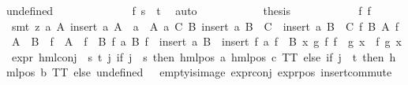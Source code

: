 \begin{isabellebody}
undefined{\isacharparenright}{\kern0pt}{\isacharparenright}{\kern0pt}\ {\isacharbackquote}{\kern0pt}\ {\isacharbraceleft}{\kern0pt}{\isacharbraceright}{\kern0pt}{\isacharparenright}{\kern0pt}{\isacharparenright}{\kern0pt}{\isachardoublequoteclose}\isanewline
\ \ \ \ \ \ \ \ \ \ \isamarkupfalse%
\ f{}\ {\isacartoucheopen}s\ {\isasymnoteq}\ t{\isacartoucheclose}\ \isamarkupfalse%
\ auto\isanewline
\ \ \ \ \ \ \ \ \isamarkupfalse%
\ \isamarkupfalse%
\ {\isacharquery}{\kern0pt}thesis\isanewline
\ \ \ \ \ \ \ \ \ \ \isamarkupfalse%
\ f{}\ f{}\ \isamarkupfalse%
\ {\isacharparenleft}{\kern0pt}smt\ {\isacharparenleft}{\kern0pt}z{}{\isacharparenright}{\kern0pt}\ {\isacartoucheopen}{\isasymAnd}a\ A{\isachardot}{\kern0pt}\ insert\ a\ A\ {\isacharequal}{\kern0pt}\ {\isacharbraceleft}{\kern0pt}a{\isacharbraceright}{\kern0pt}\ {\isasymunion}\ A{\isacartoucheclose}\ {\isacartoucheopen}{\isasymAnd}a\ C\ B{\isachardot}{\kern0pt}\ insert\ a\ B\ {\isasymunion}\ C\ {\isacharequal}{\kern0pt}\ insert\ a\ {\isacharparenleft}{\kern0pt}B\ {\isasymunion}\ C{\isacharparenright}{\kern0pt}{\isacartoucheclose}\ {\isacartoucheopen}{\isasymAnd}f\ B\ A{\isachardot}{\kern0pt}\ f\ {\isacharbackquote}{\kern0pt}\ {\isacharparenleft}{\kern0pt}A\ {\isasymunion}\ B{\isacharparenright}{\kern0pt}\ {\isacharequal}{\kern0pt}\ f\ {\isacharbackquote}{\kern0pt}\ A\ {\isasymunion}\ f\ {\isacharbackquote}{\kern0pt}\ B{\isacartoucheclose}\ {\isacartoucheopen}{\isasymAnd}f\ a\ B{\isachardot}{\kern0pt}\ f\ {\isacharbackquote}{\kern0pt}\ insert\ a\ B\ {\isacharequal}{\kern0pt}\ insert\ {\isacharparenleft}{\kern0pt}f\ a{\isacharparenright}{\kern0pt}\ {\isacharparenleft}{\kern0pt}f\ {\isacharbackquote}{\kern0pt}\ B{\isacharparenright}{\kern0pt}{\isacartoucheclose}\ {\isacartoucheopen}{\isasymAnd}x\ g\ f{\isachardot}{\kern0pt}\ {\isacharparenleft}{\kern0pt}f\ {\isasymcirc}\ g{\isacharparenright}{\kern0pt}\ x\ {\isacharequal}{\kern0pt}\ f\ {\isacharparenleft}{\kern0pt}g\ x{\isacharparenright}{\kern0pt}{\isacartoucheclose}\ {\isacartoucheopen}expr{\isacharunderscore}{\kern0pt}{}\ {\isacharparenleft}{\kern0pt}hml{\isacharunderscore}{\kern0pt}conj\ {\isacharbraceleft}{\kern0pt}{\isacharbraceright}{\kern0pt}\ {\isacharbraceleft}{\kern0pt}s{\isacharcomma}{\kern0pt}\ t{\isacharbraceright}{\kern0pt}\ {\isacharparenleft}{\kern0pt}{\isasymlambda}j{\isachardot}{\kern0pt}\ if\ j\ {\isacharequal}{\kern0pt}\ s\ then\ hml{\isacharunderscore}{\kern0pt}pos\ a\ {\isacharparenleft}{\kern0pt}hml{\isacharunderscore}{\kern0pt}pos\ c\ TT{\isacharparenright}{\kern0pt}\ else\ if\ j\ {\isacharequal}{\kern0pt}\ t\ then\ hml{\isacharunderscore}{\kern0pt}pos\ b\ TT\ else\ undefined{\isacharparenright}{\kern0pt}{\isacharparenright}{\kern0pt}\ {\isacharequal}{\kern0pt}\ {}{\isacartoucheclose}\ empty{\isacharunderscore}{\kern0pt}is{\isacharunderscore}{\kern0pt}image\ expr{\isacharunderscore}{\kern0pt}{}{\isacharunderscore}{\kern0pt}conj\ expr{\isacharunderscore}{\kern0pt}{}{\isacharunderscore}{\kern0pt}pos\ insert{\isacharunderscore}{\kern0pt}commute{\isacharparenright}{\kern0pt}\isanewline

\end{isabellebody}
